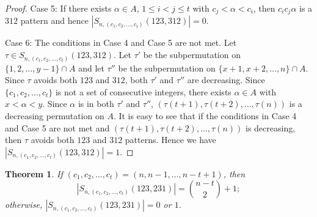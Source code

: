 \documentclass[11pt]{article}
\newtheorem{theorem}{Theorem}[section]
\theoremstyle{definition}
\numberwithin{equation}{section}
\begin{document}
\begin{proof}
Case 5: If there exists $\alpha\in A$, $1\leq i<j\leq t$ with $c_j<\alpha<c_i$, then $c_ic_j\alpha$ is a $312$ pattern and hence $|S_{n,(c_1,c_2,\ldots,c_t)}(123,312)|=0$.

Case 6: The conditions in Case 4 and Case 5 are not met. Let $\tau\in S_{n,(c_1,c_2,\ldots,c_t)}(123,312)$. Let $\tau'$ be the subpermutation on $\{1,2,\ldots,y-1\}\cap A$ and let $\tau''$ be the subpermutation on $\{x+1,x+2,\ldots,n\}\cap A$. 
        Since $\tau$ avoids both $123$ and $312$, both $\tau'$ and $\tau''$ are decreasing. Since $\{c_1,c_2,\ldots,c_t\}$ is not a set of consecutive integers, there exists $\alpha\in A$ with $x<\alpha<y$. Since $\alpha$ is in both $\tau'$ and $\tau''$, $(\tau(t+1),\tau(t+2),\ldots,\tau(n))$ is a decreasing permutation on $A$. It is easy to see that if the conditions in Case 4 and Case 5 are not met and $(\tau(t+1),\tau(t+2),\ldots,\tau(n))$ is decreasing, then $\tau$ avoids both $123$ and $312$ patterns. Hence we have $|S_{n,(c_1,c_2,\ldots,c_t)}(123,312)|=1$.
\end{proof}
\begin{theorem}
    If $(c_1,c_2,\ldots,c_t)=(n,n-1,\ldots,n-t+1)$, then 
    \[
    |S_{n,(c_1,c_2,\ldots,c_t)}(123,231)|=\binom{n-t}{2}+1;
    \]
    otherwise, $|S_{n,(c_1,c_2,\ldots,c_t)}(123,231)|=0$ or $1$.
\end{theorem}
\end{document}
